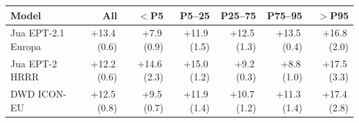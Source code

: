 \begin{tabular}{@{}lrrrrrr@{}}
\toprule
Model & All & $<$P5 & P5--25 & P25--75 & P75--95 & $>$P95 \\
\midrule
Jua EPT-2.1 Europa & +13.4\,(0.6) & +7.9\,(0.9) & +11.9\,(1.5) & +12.5\,(1.3) & +13.5\,(0.4) & +16.8\,(2.0) \\\addlinespace[0.35em]
Jua EPT-2 HRRR & +12.2\,(0.6) & +14.6\,(2.3) & +15.0\,(1.2) & +9.2\,(0.3) & +8.8\,(1.0) & +17.5\,(3.3) \\\addlinespace[0.35em]
DWD ICON-EU & +12.5\,(0.8) & +9.5\,(0.7) & +11.9\,(1.4) & +10.7\,(1.2) & +11.3\,(1.4) & +17.4\,(2.8) \\
\bottomrule
\end{tabular}
